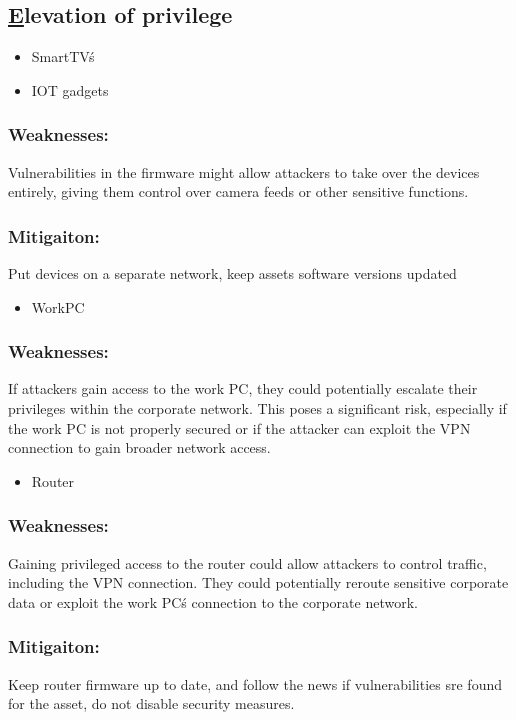 \documentclass[
	letterpaper, %
	10pt, %
	unnumberedsections, %
	twoside, %
]{APAAssignment}
\begin{document}
\begin{singlespace}
\subsection{\underline{E}levation of privilege} 



	\begin{itemize}
		\item SmartTV\'s
		\item IOT gadgets 
	\end{itemize}
	
	\subsubsection{Weaknesses:} Vulnerabilities in the firmware might allow attackers to take over the devices entirely, giving them control over camera feeds or other sensitive functions.
	\subsubsection{Mitigaiton:} Put devices on a separate network, keep assets software versions updated
	
	\begin{itemize}
		\item WorkPC
	\end{itemize}
	
	\subsubsection{Weaknesses:} If attackers gain access to the work PC, they could potentially escalate their privileges within the corporate network. This poses a significant risk, especially if the work PC is not properly secured or if the attacker can exploit the VPN connection to gain broader network access.

	\begin{itemize}
		\item Router
	\end{itemize}
	
	\subsubsection{Weaknesses:} Gaining privileged access to the router could allow attackers to control traffic, including the VPN connection. They could potentially reroute sensitive corporate data or exploit the work PC\'s connection to the corporate network.
	\subsubsection{Mitigaiton:} Keep router firmware up to date, and follow the news if vulnerabilities sre found for the asset, do not disable security measures.
	
	
\end{singlespace}
\end{document}
